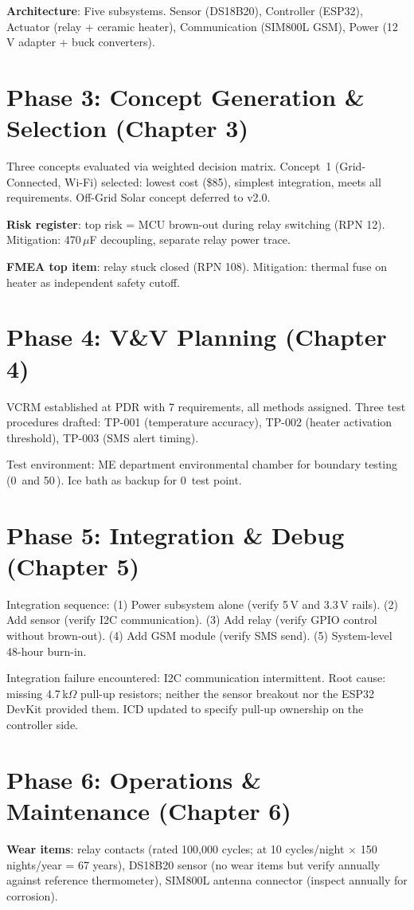 \textbf{Architecture}: Five subsystems. Sensor (DS18B20), Controller (ESP32), Actuator (relay + ceramic heater), Communication (SIM800L GSM), Power (12\,V adapter + buck converters).

\section*{Phase 3: Concept Generation \& Selection (Chapter 3)}
Three concepts evaluated via weighted decision matrix. Concept~1 (Grid-Connected, Wi-Fi) selected: lowest cost (\$85), simplest integration, meets all requirements. Off-Grid Solar concept deferred to v2.0.

\textbf{Risk register}: top risk = MCU brown-out during relay switching (RPN 12). Mitigation: 470\,$\mu$F decoupling, separate relay power trace.

\textbf{FMEA top item}: relay stuck closed (RPN 108). Mitigation: thermal fuse on heater as independent safety cutoff.

\section*{Phase 4: V\&V Planning (Chapter 4)}
VCRM established at PDR with 7 requirements, all methods assigned. Three test procedures drafted: TP-001 (temperature accuracy), TP-002 (heater activation threshold), TP-003 (SMS alert timing).

Test environment: ME department environmental chamber for boundary testing (0\,\degC{} and 50\,\degC{}). Ice bath as backup for 0\,\degC{} test point.

\section*{Phase 5: Integration \& Debug (Chapter 5)}
Integration sequence: (1) Power subsystem alone (verify 5\,V and 3.3\,V rails). (2) Add sensor (verify I2C communication). (3) Add relay (verify GPIO control without brown-out). (4) Add GSM module (verify SMS send). (5) System-level 48-hour burn-in.

Integration failure encountered: I2C communication intermittent. Root cause: missing 4.7\,k$\Omega$ pull-up resistors; neither the sensor breakout nor the ESP32 DevKit provided them. ICD updated to specify pull-up ownership on the controller side.

\section*{Phase 6: Operations \& Maintenance (Chapter 6)}
\textbf{Wear items}: relay contacts (rated 100,000 cycles; at 10 cycles/night $\times$ 150 nights/year = 67 years), DS18B20 sensor (no wear items but verify annually against reference thermometer), SIM800L antenna connector (inspect annually for corrosion).


